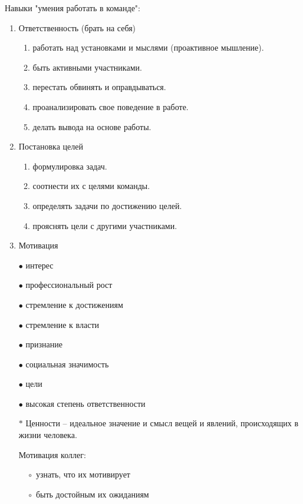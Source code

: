 \documentclass[12pt,a4paper]{report}
\begin{document}
\bigskip
Навыки "умения работать в команде":
\begin{enumerate}
	\item Ответственность (брать на себя)
	\begin{enumerate}
		\item работать над установками и мыслями (проактивное мышление).
		\item быть активными участниками.
		\item перестать обвинять и оправдываться.
		\item проанализировать свое поведение в работе.
		\item делать вывода на основе работы.
	\end{enumerate}
	\item Постановка целей
	\begin{enumerate}
		\item формулировка задач.
		\item соотнести их с целями команды.
		\item определять задачи по достижению целей.
		\item прояснять цели с другими участниками.
	\end{enumerate}
	\item Мотивация
	
	\medskip
	\begin{minipage}{0.4\textwidth}
		$\bullet$ интерес
		
		$\bullet$ профессиональный рост
		
		$\bullet$ стремление к достижениям
		
		$\bullet$ стремление к власти
	\end{minipage}
	\hfill
	\begin{minipage}{0.4\textwidth}
		$\bullet$ признание
		
		$\bullet$ социальная значимость
		
		$\bullet$ цели
		
		$\bullet$ высокая степень ответственности
	\end{minipage}

\medskip
$\ast$ Ценности -- идеальное значение и смысл вещей и явлений, происходящих в жизни человека.

\medskip
Мотивация коллег:

	$\hspace{1em}\circ$ узнать, что их мотивирует
	
	$\hspace{1em}\circ$ быть достойным их ожиданиям
	

\end{enumerate}
\end{document}
